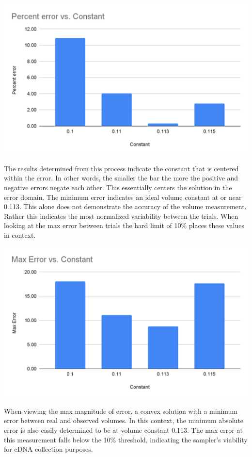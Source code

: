 \documentclass[11pt, letterpaper]{article}
\begin{document}
\begin{center}
	\includegraphics[scale=1]{./Assets/Flow1.png}
\end{center}

The results determined from this process indicate the constant that is centered within the error. In other words, the smaller the bar the more the positive and negative errors negate each other. This essentially centers the solution in the error domain. The minimum error indicates an ideal volume constant at or near 0.113. This alone does not demonstrate the accuracy of the volume measurement. Rather this indicates the most normalized variability between the trials. When looking at the max error between trials the hard limit of 10\% places these values in context.

\begin{center}
	\includegraphics[scale=1]{./Assets/Flow2.png}
\end{center}

When viewing the max magnitude of error, a convex solution with a minimum error between real and observed volumes. In this context, the minimum absolute error is also easily determined to be at volume constant 0.113. The max error at this measurement falls below the 10\% threshold, indicating the sampler’s viability for eDNA collection purposes.
\end{document}

